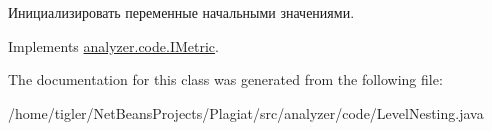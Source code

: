 Инициализировать переменные начальными значениями. 

Implements \hyperlink{interfaceanalyzer_1_1code_1_1IMetric}{analyzer.\+code.\+I\+Metric}.



The documentation for this class was generated from the following file\+:\begin{DoxyCompactItemize}
\item 
/home/tigler/\+Net\+Beans\+Projects/\+Plagiat/src/analyzer/code/Level\+Nesting.\+java\end{DoxyCompactItemize}
